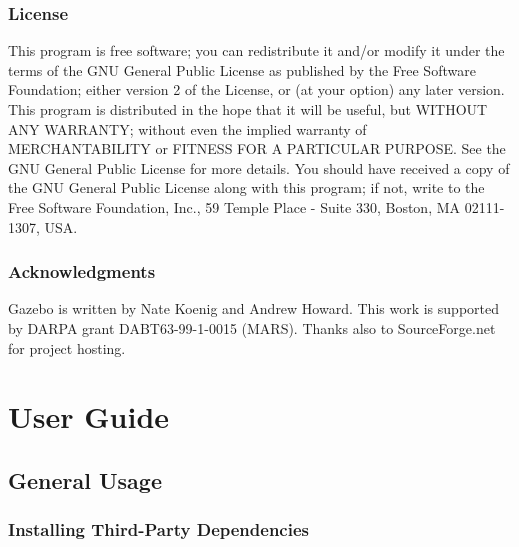 \documentclass[11pt]{report}
\begin{document}
\section{License}

This program is free software; you can redistribute it and/or modify
it under the terms of the GNU General Public License as published by
the Free Software Foundation; either version 2 of the License, or (at
your option) any later version.  This program is distributed in the
hope that it will be useful, but WITHOUT ANY WARRANTY; without even
the implied warranty of MERCHANTABILITY or FITNESS FOR A PARTICULAR
PURPOSE.  See the GNU General Public License for more details.  You
should have received a copy of the GNU General Public License along
with this program; if not, write to the Free Software Foundation,
Inc., 59 Temple Place - Suite 330, Boston, MA 02111-1307, USA.

\section{Acknowledgments}

Gazebo is written by Nate Koenig and Andrew Howard.  This work is
supported by DARPA grant DABT63-99-1-0015 (MARS).  Thanks also to
SourceForge.net for project hosting.



\part{User Guide}



\chapter{General Usage}

\section{Installing Third-Party Dependencies}
\end{document}
